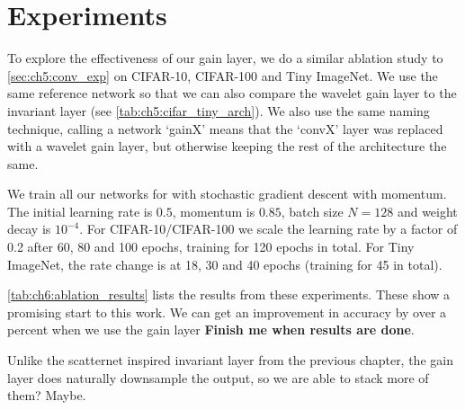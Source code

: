 \section{Experiments}\label{sec:ch6:results}
To explore the effectiveness of our gain layer, we do a similar ablation study
to \autoref{sec:ch5:conv_exp} on CIFAR-10, CIFAR-100 and Tiny ImageNet. We use
the same reference network so that we can also compare the wavelet gain layer to the
invariant layer (see \autoref{tab:ch5:cifar_tiny_arch}). We also use the same
naming technique, calling a network `gainX' means that the `convX' layer was
replaced with a wavelet gain layer, but otherwise keeping the rest of the
architecture the same. 

We train all our networks for with stochastic gradient descent with momentum.
The initial learning rate is $0.5$, momentum is $0.85$, batch size $N=128$ and
weight decay is $10^{-4}$. For CIFAR-10/CIFAR-100 we scale the learning rate by
a factor of 0.2 after 60, 80 and 100 epochs, training for 120 epochs in total.
For Tiny ImageNet, the rate change is at 18, 30 and 40 epochs (training for 45 in total).



\autoref{tab:ch6:ablation_results} lists the results from these experiments.
These show a promising start to this work. We can get an improvement in accuracy
by over a percent when we use the gain layer \textbf{Finish me when results are
done}.

Unlike the scatternet inspired invariant layer from the previous chapter, the
gain layer does naturally downsample the output, so we are able to stack more of
them? Maybe.

